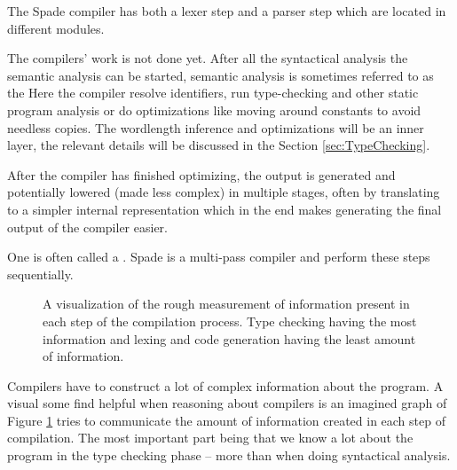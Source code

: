 The Spade compiler has both a lexer step and a parser step which are located in different modules.

The compilers' work is not done yet. After all the syntactical analysis the semantic analysis can be started, semantic analysis is sometimes referred to as the  Here the compiler resolve identifiers, run type-checking and other static program analysis or do optimizations like moving around constants to avoid needless copies. The wordlength inference and optimizations will be an inner layer, the relevant details will be discussed in the Section \ref{sec:TypeChecking}. 

After the compiler has finished optimizing, the output is generated and potentially lowered (made less complex) in multiple stages, often by translating to a simpler internal representation which in the end makes generating the final output of the compiler easier.

One  is often called a . Spade is a multi-pass compiler and perform these steps sequentially.
\cite{src:DragonBook, src:CraftingInterp, src:KKLectures}

\begin{figure}[h!]
\begin{center}
  \caption{A visualization of the rough measurement of information present in each step of the compilation process. Type checking having the most information and lexing and code generation having the least amount of information.}
  \label{fig:InformationCompilation}
\end{center}
\end{figure}

Compilers have to construct a lot of complex information about the program. A visual some find helpful when reasoning about compilers is an imagined graph of  Figure \ref{fig:InformationCompilation} tries to communicate the amount of information created in each step of compilation. The most important part being that we know a lot about the program in the type checking phase -- more than when doing syntactical analysis.


